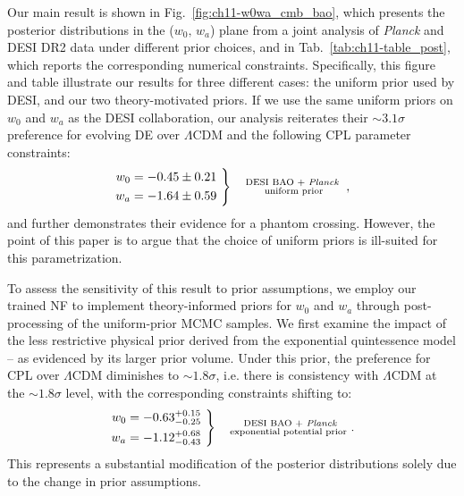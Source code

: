 Our main result is shown in Fig.~\ref{fig:ch11-w0wa_cmb_bao}, which presents the posterior distributions in the ($w_0,\,w_a$) plane from a joint analysis of \textit{Planck} and DESI DR2 data under different prior choices, and in Tab.~\ref{tab:ch11-table_post}, which reports the corresponding numerical constraints. Specifically, this figure and table illustrate our results for three different cases: the uniform prior used by DESI, and our two theory-motivated priors. If we use the same uniform priors on $w_0$ and $w_a$ as the DESI collaboration, our analysis reiterates their $\sim 3.1\sigma$ preference for evolving DE over $\Lambda$CDM and the following CPL parameter constraints:
\begin{equation}
\left.
\begin{aligned}
w_0 &= -0.45\pm 0.21   \\
w_a &= -1.64\pm 0.59
\end{aligned}
\ \right\} \quad \substack{\text{DESI BAO + {\it Planck} } \\ \text{uniform prior}}~,
\end{equation}
and further demonstrates their evidence for a phantom crossing. However, the point of this paper is to argue that the choice of uniform priors is ill-suited for this parametrization.

To assess the sensitivity of this result to prior assumptions, we employ our trained NF to implement theory-informed priors for $w_0$ and $w_a$ through post-processing of the uniform-prior MCMC samples. We first examine the impact of the less restrictive physical prior derived from the exponential quintessence model -- as evidenced by its larger prior volume. Under this prior, the preference for CPL over $\Lambda$CDM diminishes to $\sim 1.8\sigma$, i.e. there is consistency with $\Lambda$CDM at the $\sim 1.8\sigma$ level, with the corresponding constraints shifting to:
\begin{equation}
\left.
\begin{aligned}
w_0 &= -0.63^{+0.15}_{-0.25}    \\
w_a &= -1.12^{+0.68}_{-0.43}
\end{aligned}
\ \right\} \quad \substack{\text{ DESI BAO + {\it Planck}}  \\ \text{exponential potential prior}}~.
\end{equation}
This represents a substantial modification of the posterior distributions solely due to the change in prior assumptions.

